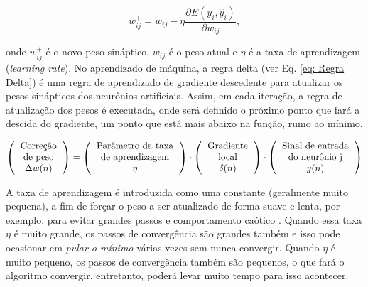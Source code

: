 \begin{equation}    \label{eq: peso W}
    w_{ij}^{+} = w_{ij} - \eta\frac{\partial E(y_{i},\hat{y}_{i})}{\partial w_{ij}},
\end{equation}

\noindent
onde $w^{+}_{ij}$ é o novo peso sináptico, $w_{ij}$ é o peso atual e $\eta$ é a taxa de aprendizagem (\textit{learning rate}). No aprendizado de máquina, a regra delta (ver Eq. \ref{eq: Regra Delta}) é uma regra de aprendizado de gradiente descedente para atualizar os pesos sinápticos dos neurônios artificiais. Assim, em cada iteração, a regra de atualização dos pesos é executada, onde será definido o próximo ponto que fará a descida do gradiente, um ponto que está mais abaixo na função, rumo ao mínimo.

\begin{equation}    \label{eq: Regra Delta}
    \left({\begin{tabular}{c}
    Correção \\
    de peso\\
    $\Delta w(n)$
    \end{tabular}}\right)
    =
    \left({\begin{tabular}{c}
    Parâmetro da taxa\\
    de aprendizagem\\
    $\eta$
    \end{tabular}}\right)
    \cdot
    \left({\begin{tabular}{c}
    Gradiente \\
    local\\
    $\delta(n)$
    \end{tabular}}\right)
    \cdot
    \left({\begin{tabular}{c}
    Sinal de entrada\\
    do neurônio j\\
    $y(n)$
    \end{tabular}}\right)
\end{equation}

A taxa de aprendizagem é introduzida como uma constante (geralmente muito pequena), a fim de forçar o peso a ser atualizado de forma suave e lenta, por exemplo, para evitar grandes passos e comportamento caótico \cite{geron2019hands,haykin2007redes}. Quando essa taxa $\eta$ é muito grande, os passos de convergência são grandes também e isso pode ocasionar em \textit{pular o mínimo} várias vezes sem nunca convergir. Quando $\eta$ é muito pequeno, os passos de convergência também são pequenos, o que fará o algoritmo convergir, entretanto, poderá levar muito tempo para isso acontecer.